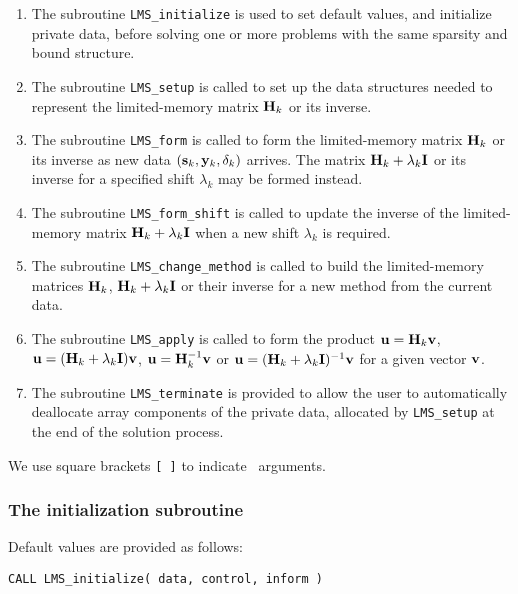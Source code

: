 \documentclass{galahad}
\newcommand{\packagename}{LMS}
\begin{document}
\begin{enumerate}
\item The subroutine
      {\tt \packagename\_initialize}
      is used to set default values, and initialize private data,
      before solving one or more problems with the
      same sparsity and bound structure.
\item The subroutine
      {\tt \packagename\_setup}
      is called to set up the data structures needed to represent
      the limited-memory matrix ${\mathbf{H}}_k$ or its inverse.
\item The subroutine
      {\tt \packagename\_form}
      is called to form the limited-memory matrix ${\mathbf{H}}_k$ or its inverse
      as new data $({\mathbf{s}}_k,{\mathbf{y}}_k,\delta_k)$ arrives. The matrix
      ${\mathbf{H}}_k+ \lambda_k{\mathbf{I}}$ or its inverse for a specified shift
      $\lambda_k$ may be formed instead.
\item The subroutine
      {\tt \packagename\_form\_shift}
      is called to update the inverse of the
      limited-memory matrix ${\mathbf{H}}_k+ \lambda_k{\mathbf{I}}$
      when a new shift $\lambda_k$ is required.
\item The subroutine
      {\tt \packagename\_change\_method}
      is called to build the limited-memory matrices ${\mathbf{H}}_k$,
      ${\mathbf{H}}_k+ \lambda_k{\mathbf{I}}$ or their inverse
      for a new method from the current data.
\item The subroutine
      {\tt \packagename\_apply}
      is called to form the product ${\mathbf{u}} = {\mathbf{H}}_k {\mathbf{v}}$,
      ${\mathbf{u}} = ( {\mathbf{H}}_k + \lambda_k {\mathbf{I}} ) {\mathbf{v}}$,
      ${\mathbf{u}} = {\mathbf{H}}_k^{-1} {\mathbf{v}}$ or
      ${\mathbf{u}} = ( {\mathbf{H}}_k + \lambda_k {\mathbf{I}}) ^{-1} {\mathbf{v}}$ for a given vector ${\mathbf{v}}$.
\item The subroutine
      {\tt \packagename\_terminate}
      is provided to allow the user to automatically deallocate array
       components of the private data, allocated by
       {\tt \packagename\_setup}
       at the end of the solution process.
\end{enumerate}
We use square brackets {\tt [ ]} to indicate \optional\ arguments.


\subsubsection{The initialization subroutine}\label{subinit}
 Default values are provided as follows:
\vspace*{1mm}

\hspace{8mm}
{\tt CALL \packagename\_initialize( data, control, inform )}
\end{document}
